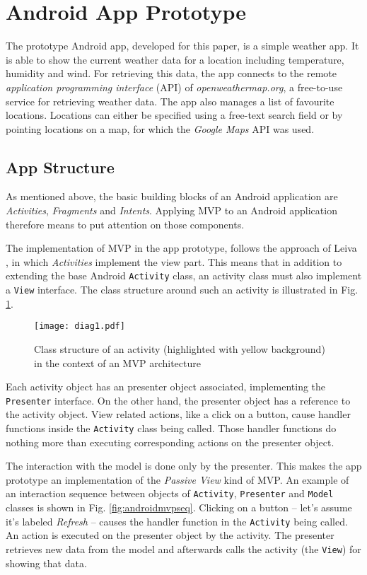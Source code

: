 
\section{Android App Prototype}

The prototype Android app, developed for this paper, is a simple weather app. It is able to show the current weather data for a location including temperature, humidity and wind. For retrieving this data, the app connects to the remote \emph{application programming interface} (API) of \emph{openweathermap.org}, a free-to-use service for retrieving weather data. The app also manages a list of favourite locations. Locations can either be specified using a free-text search field or by pointing locations on a map, for which the \emph{Google Maps} API was used.

\subsection{App Structure}

As mentioned above, the basic building blocks of an Android application are \emph{Activities}, \emph{Fragments} and \emph{Intents}. Applying MVP to an Android application therefore means to put attention on those components.

The implementation of MVP in the app prototype, follows the approach of Leiva \cite{AntLeiv14}, in which \emph{Activities} implement the view part. This means that in addition to extending the base Android \texttt{Activity} class, an activity class must also implement a \texttt{View} interface. The class structure around such an activity is illustrated in Fig. \ref{fig:androidmvp}.

\begin{figure}[h]
\centering
\texttt{[image: diag1.pdf]}
\caption{Class structure of an activity (highlighted with yellow background) in the context of an MVP architecture}
\label{fig:androidmvp}
\end{figure}

Each activity object has an presenter object associated, implementing the \texttt{Presenter} interface. On the other hand, the presenter object has a reference to the activity object. View related actions, like a click on a button, cause handler functions inside the \texttt{Activity} class being called. Those handler functions do nothing more than executing corresponding actions on the presenter object.

The interaction with the model is done only by the presenter. This makes the app prototype an implementation of the \emph{Passive View} kind of MVP.
An example of an interaction sequence between objects of \texttt{Activity}, \texttt{Presenter} and \texttt{Model} classes is shown in Fig. \ref{fig:androidmvpseq}. Clicking on a button -- let's assume it's labeled \emph{Refresh} -- causes the handler function in the \texttt{Activity} being called. An action is executed on the presenter object by the activity. The presenter retrieves new data from the model and afterwards calls the activity (the \texttt{View}) for showing that data.


